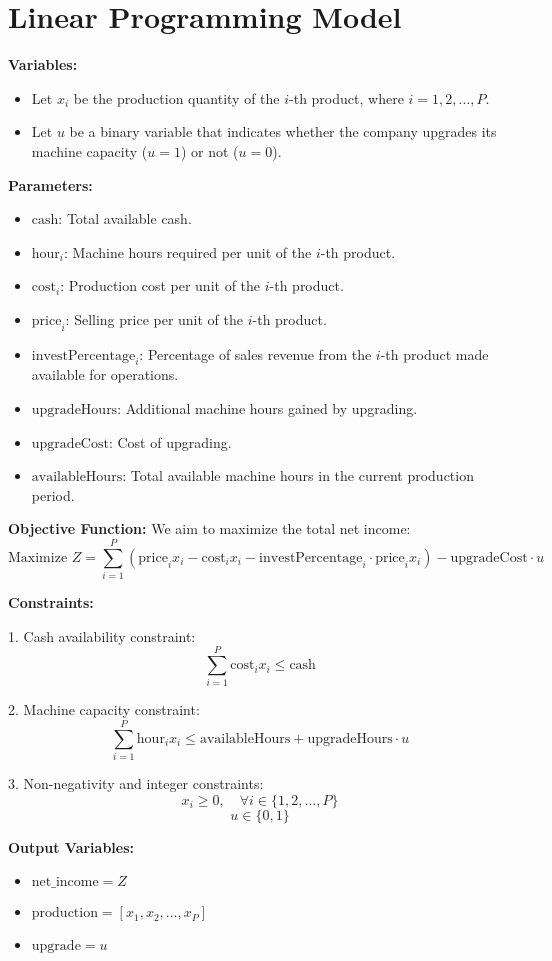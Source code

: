 \documentclass{article}
\begin{document}
\section*{Linear Programming Model}

\textbf{Variables:}
\begin{itemize}
    \item Let \( x_i \) be the production quantity of the \( i \)-th product, where \( i = 1, 2, \ldots, P \).
    \item Let \( u \) be a binary variable that indicates whether the company upgrades its machine capacity (\( u = 1 \)) or not (\( u = 0 \)).
\end{itemize}

\textbf{Parameters:}
\begin{itemize}
    \item \( \text{cash} \): Total available cash.
    \item \( \text{hour}_i \): Machine hours required per unit of the \( i \)-th product.
    \item \( \text{cost}_i \): Production cost per unit of the \( i \)-th product.
    \item \( \text{price}_i \): Selling price per unit of the \( i \)-th product.
    \item \( \text{investPercentage}_i \): Percentage of sales revenue from the \( i \)-th product made available for operations.
    \item \( \text{upgradeHours} \): Additional machine hours gained by upgrading.
    \item \( \text{upgradeCost} \): Cost of upgrading.
    \item \( \text{availableHours} \): Total available machine hours in the current production period.
\end{itemize}

\textbf{Objective Function:}
We aim to maximize the total net income:
\[
\text{Maximize } Z = \sum_{i=1}^{P} \left( \text{price}_i x_i - \text{cost}_i x_i - \text{investPercentage}_i \cdot \text{price}_i x_i \right) - \text{upgradeCost} \cdot u
\]

\textbf{Constraints:}

1. Cash availability constraint:
\[
\sum_{i=1}^{P} \text{cost}_i x_i \leq \text{cash}
\]

2. Machine capacity constraint:
\[
\sum_{i=1}^{P} \text{hour}_i x_i \leq \text{availableHours} + \text{upgradeHours} \cdot u
\]

3. Non-negativity and integer constraints:
\[
x_i \geq 0, \quad \forall i \in \{1, 2, \ldots, P\}
\]
\[
u \in \{0, 1\}
\]

\textbf{Output Variables:}
\begin{itemize}
    \item \( \text{net\_income} = Z \)
    \item \( \text{production} = [x_1, x_2, \ldots, x_P] \)
    \item \( \text{upgrade} = u \)
\end{itemize}
\end{document}
